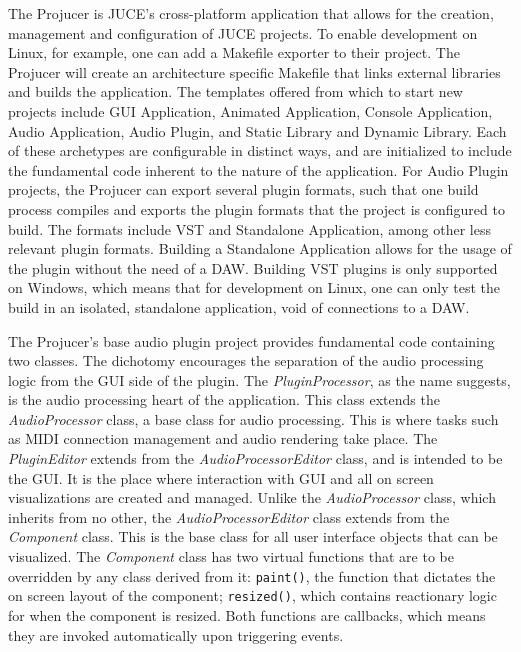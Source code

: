 \documentclass[12pt, a4paper, hidelinks]{article}
\begin{document}
	The Projucer is JUCE's cross-platform application that allows for the creation, management and configuration of JUCE projects. To enable development on Linux, for example, one can add a Makefile exporter to their project. The Projucer will create an architecture specific Makefile that links external libraries and builds the application. The templates offered from which to start new projects include GUI Application, Animated Application, Console Application, Audio Application, Audio Plugin, and Static Library and Dynamic Library. Each of these archetypes are configurable in distinct ways, and are initialized to include the fundamental code inherent to the nature of the application. For Audio Plugin projects, the Projucer can export several plugin formats, such that one build process compiles and exports the plugin formats that the project is configured to build. The formats include VST and Standalone Application, among other less relevant plugin formats. Building a Standalone Application allows for the usage of the plugin without the need of a DAW. Building VST plugins is only supported on Windows, which means that for development on Linux, one can only test the build in an isolated, standalone application, void of connections to a DAW. \par
	
	The Projucer's base audio plugin project provides fundamental code containing two classes. The dichotomy encourages the separation of the audio processing logic from the GUI side of the plugin. The \textit{PluginProcessor}, as the name suggests, is the audio processing heart of the application. This class extends the \textit{AudioProcessor} class, a base class for audio processing. This is where tasks such as MIDI connection management and audio rendering take place. The \textit{PluginEditor} extends from the \textit{AudioProcessorEditor} class, and is intended to be the GUI. It is the place where interaction with GUI and all on screen visualizations are created and managed. Unlike the \textit{AudioProcessor} class, which inherits from no other, the \textit{AudioProcessorEditor} class extends from the \textit{Component} class. This is the base class for all user interface objects that can be visualized. The \textit{Component} class has two virtual functions that are to be overridden by any class derived from it: \texttt{paint()}, the function that dictates the on screen layout of the component; \texttt{resized()}, which contains reactionary logic for when the component is resized. Both functions are callbacks, which means they are invoked automatically upon triggering events.\par
	
\end{document}

